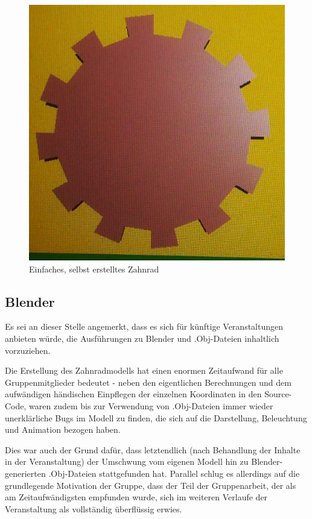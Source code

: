 \documentclass{article}
\begin{document}
\begin{figure}
\centering
\includegraphics[scale=1.0]{res/Gear.png}
\caption{Einfaches, selbst erstelltes Zahnrad}
\label{fig:gear}
\end{figure}

\subsection{Blender}
Es sei an dieser Stelle angemerkt, dass es sich für künftige Veranstaltungen anbieten würde, die Ausführungen zu Blender und .Obj-Dateien inhaltlich vorzuziehen. 

Die Erstellung des Zahnradmodells hat einen enormen Zeitaufwand für alle Gruppenmitglieder bedeutet - neben den eigentlichen Berechnungen und dem aufwändigen händischen Einpflegen der einzelnen Koordinaten in den Source-Code, waren zudem bis zur Verwendung von .Obj-Dateien immer wieder unerklärliche Bugs im Modell zu finden, die sich auf die Darstellung, Beleuchtung und Animation bezogen haben. 

Dies war auch der Grund dafür, dass letztendlich (nach Behandlung der Inhalte in der Veranstaltung) der Umschwung vom eigenen Modell hin zu Blender-generierten .Obj-Dateien stattgefunden hat. 
Parallel schlug es allerdings auf die grundlegende Motivation der Gruppe, dass der Teil der Gruppenarbeit, der als am Zeitaufwändigsten empfunden wurde, sich im weiteren Verlaufe der Veranstaltung als vollständig überflüssig erwies. 
\newpage
\end{document}
